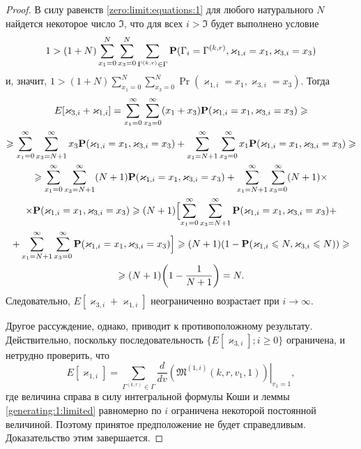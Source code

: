 \documentclass{report}
\begin{document}
\begin{proof}
В силу равенств \eqref{zero:limit:equations:1} для любого натурального $N$ найдется некоторое число $\mathfrak{I}$, что для всех $i > \mathfrak{I}$ будет выполнено условие
$$1 > (1+N) \sum_{x_1=0}^{N}\sum_{x_3=0}^{N} \sum_{\Gamma^{(k,r)}\in \Gamma}  \Pr(\Gamma_{i}=\Gamma^{(k,r)}, \varkappa_{1,i} \hm{} = x_1, \varkappa_{3,i}=x_3)$$
и, значит, $1 >(1+N) \sum_{x_1=0}^{N}\sum_{x_3=0}^{N} \Pr(\varkappa_{1,i} = x_1, \varkappa_{3,i}=x_3)$. Тогда
\begin{multline*}
E[\varkappa_{3,i}+\varkappa_{1,i}] = \sum_{x_1=0}^{\infty}\sum_{x_3=0}^{\infty} (x_1 + x_3) \Pr(\varkappa_{1,i} = x_1, \varkappa_{3,i}=x_3) \geqslant \\
\geqslant
 \sum_{x_1=0}^{\infty}\sum_{x_3=N+1}^{\infty} x_3 \Pr(\varkappa_{1,i} = x_1, \varkappa_{3,i}=x_3) +  \sum_{x_1=N+1}^{\infty}\sum_{x_3=0}^{\infty} x_1 \Pr(\varkappa_{1,i} = x_1, \varkappa_{3,i}=x_3) \geqslant \\
 \geqslant
  \sum_{x_1=0}^{\infty}\sum_{x_3=N+1}^{\infty} (N+1) \Pr(\varkappa_{1,i} = x_1, \varkappa_{3,i}=x_3) + \sum_{x_1=N+1}^{\infty}\sum_{x_3=0}^{\infty} (N+1) \times \\ \times \Pr(\varkappa_{1,i} = x_1, \varkappa_{3,i}=x_3)
  \geqslant
  (N+1)\Bigl[\sum_{x_1=0}^{\infty}\sum_{x_3=N+1}^{\infty} \Pr(\varkappa_{1,i} = x_1, \varkappa_{3,i}=x_3) + \\+ \sum_{x_1=N+1}^{\infty}\sum_{x_3=0}^{\infty}\Pr(\varkappa_{1,i} = x_1, \varkappa_{3,i}=x_3)\Bigr] 
  \geqslant (N+1)(1-\Pr(\varkappa_{1,i} \leqslant N, \varkappa_{3,i} \leqslant N)  ) 
  \geqslant \\ \geqslant
  (N+1)\biggl(1-\frac{1}{N+1}\biggr) = N.
\end{multline*}
Следовательно, $E[\varkappa_{3,i}+\varkappa_{1,i}]$ неограниченно возрастает при $i \to \infty$. 

Другое рассуждение, однако, приводит к противоположному результату. Действительно, поскольку последовательность $\{E[\varkappa_{3,i}]; i \geqslant 0\}$ ограничена, и нетрудно проверить, что
$$
E[\varkappa_{1,i}] =\sum_{\Gamma^{(k,r)}\in \Gamma} \frac{d}{dv}\left.\left(\mathfrak{M}^{(1,i)}(k,r,v_1,1)\right)\right|_{v_1=1},
$$
где величина справа в силу интегральной формулы Коши и леммы \ref{generating:1:limited} равномерно по $i$ ограничена некоторой постоянной величиной. 
 Поэтому принятое предположение не будет справедливым. Доказательство этим завершается.
\end{proof}
\end{document}

